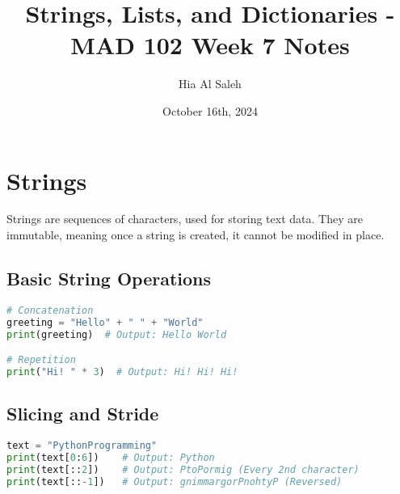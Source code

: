 \documentclass{article}
\title{Strings, Lists, and Dictionaries - MAD 102 Week 7 Notes}
\author{Hia Al Saleh}
\date{October 16th, 2024}
\begin{document}
\maketitle
\tableofcontents
\newpage

\section{Strings}
Strings are sequences of characters, used for storing text data. They are immutable, meaning once a string is created, it cannot be modified in place.

\subsection{Basic String Operations}
\begin{lstlisting}[language=Python]
# Concatenation
greeting = "Hello" + " " + "World"
print(greeting)  # Output: Hello World

# Repetition
print("Hi! " * 3)  # Output: Hi! Hi! Hi!
\end{lstlisting}

\subsection{Slicing and Stride}
\begin{lstlisting}[language=Python]
text = "PythonProgramming"
print(text[0:6])    # Output: Python
print(text[::2])    # Output: PtoPormig (Every 2nd character)
print(text[::-1])   # Output: gnimmargorPnohtyP (Reversed)
\end{lstlisting}
\end{document}
